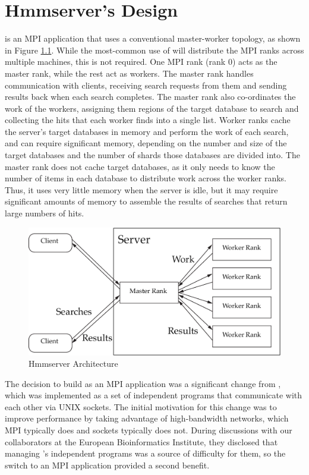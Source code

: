 \documentclass[notoc,justified,openany]{tufte-book}    %
\newcommand{\hmmserver}{\mono{hmmserver}\xspace}
\newcommand{\Hmmserver}{\mono{Hmmserver}\xspace}
\newcommand{\hmmpgmd}{\mono{hmmpgmd}\xspace}
\begin{document}
\chapter{Hmmserver's Design}
\Hmmserver is an MPI application that uses a conventional master-worker topology, as shown in Figure \ref{fig:server}.  While the most-common use of \hmmserver will distribute the MPI ranks across multiple machines, this is not required.  One MPI rank (rank 0) acts as the master rank, while the rest act as workers.  The master rank handles communication with clients, receiving search requests from them and sending results back when each search completes.  The master rank also co-ordinates the work of the workers, assigning them regions of the target database to search and collecting the hits that each worker finds into a single list.  Worker ranks cache the server's target databases in memory and perform the work of each search, and can require significant memory, depending on the number and size of the target databases and the number of shards those databases are divided into.  The master rank does not cache target databases, as it only needs to know the number of items in each database to distribute work across the worker ranks.  Thus, it uses very little memory when the server is idle, but it may require significant amounts of memory to assemble the results of searches that return large numbers of hits.
\begin{figure}
  \includegraphics[width=\textwidth]{inclusions/server.pdf}
  \caption{Hmmserver Architecture}
  \label{fig:server}
  \end{figure} 
The decision to build \hmmserver as an MPI application was a significant change from \hmmpgmd, which was implemented as a set of independent programs that communicate with each other via UNIX sockets.  The initial motivation for this change was to improve performance by taking advantage of high-bandwidth networks, which MPI typically does and sockets typically does not.  During discussions with our collaborators at the European Bioinformatics Institute, they disclosed that managing \hmmpgmd's independent programs was a source of difficulty for them, so the switch to an MPI application provided a second benefit.
\end{document}
